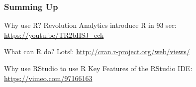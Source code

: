 \documentclass[xcolor=dvipsnames]{beamer}
\begin{document}


\begin{frame}
\frametitle{Summing Up}
\begin{block}{Why use R?}
Revolution Analytics introduce R in 93 sec: 
\newline
\newline
\url{https://youtu.be/TR2bHSJ_eck}
\end{block}

\begin{block}{What can R do?}
Lots!:
\newline
\newline
\url{http://cran.r-project.org/web/views/}
\end{block}

\begin{block}{Why use RStudio to use R}
Key Features of the RStudio IDE: 
\newline
\newline
\url{https://vimeo.com/97166163}
\end{block}

\end{frame}
\end{document}
